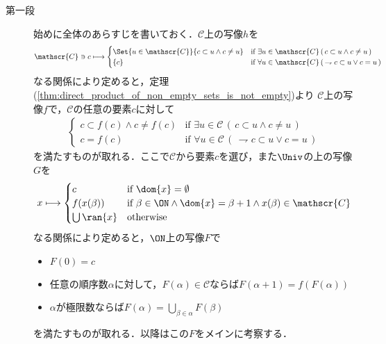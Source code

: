	\begin{sketch}\mbox{}
		\begin{description}
			\item[第一段]
				始めに全体のあらすじを書いておく．$\mathscr{C}$上の写像$h$を
				\begin{align}
					\mathscr{C} \ni c \longmapsto
					\begin{cases}
						\Set{u \in \mathscr{C}}{ c \subset u \wedge c \neq u} 
						& \mbox{if } \exists u \in \mathscr{C}\, (\, c \subset u \wedge c \neq u\, ) \\
						\{c\} &\mbox{if } \forall u \in \mathscr{C}\, (\, \rightharpoondown c \subset u \vee c=u\, )
					\end{cases}
				\end{align}
				なる関係により定めると，定理(\ref{thm:direct_product_of_non_empty_sets_is_not_empty})より
				$\mathscr{C}$上の写像$f$で，$\mathscr{C}$の任意の要素$c$に対して
				\begin{align}
					\begin{cases}
						c \subset f(c) \wedge c \neq f(c) 
						& \mbox{if } \exists u \in \mathscr{C}\, (\, c \subset u \wedge c \neq u\, ) \\
						c=f(c) & \mbox{if } \forall u \in \mathscr{C}\, (\, \rightharpoondown c \subset u \vee c=u\, )
					\end{cases}
				\end{align}
				を満たすものが取れる．ここで$\mathscr{C}$から要素$c$を選び，また$\Univ$の上の写像$G$を
				\begin{align}
					x \longmapsto
					\begin{cases}
						c & \mbox{if } \dom{x} = \emptyset \\
						f(x(\beta)) & \mbox{if } \beta \in \ON \wedge \dom{x} = \beta+1 \wedge x(\beta) \in \mathscr{C} \\
						\bigcup \ran{x} & \mbox{otherwise}
					\end{cases}
				\end{align}
				なる関係により定めると，$\ON$上の写像$F$で
				\begin{itemize}
					\item $F(0) = c$
					\item 任意の順序数$\alpha$に対して，$F(\alpha) \in \mathscr{C}$ならば$F(\alpha+1)=f(F(\alpha))$
					\item $\alpha$が極限数ならば$F(\alpha)=\bigcup_{\beta \in \alpha} F(\beta)$
				\end{itemize}
				を満たすものが取れる．以降はこの$F$をメインに考察する．
				

\end{description}
\end{sketch}
